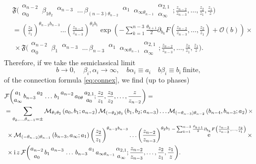 \documentclass[11pt]{article}
\numberwithin{equation}{section}
\newcommand{\ri}{{\rm i}}
\DeclareMathOperator{\re}{{\rm e}}
\newcommand{\Fn}[8]{\mathfrak{F}\bigg( \begin{matrix} #2 \\ #1 \end{matrix} \, #3 \, \begin{matrix} #4  \\ \, \end{matrix} \,#5 \, #6\,\begin{matrix} #7 \\  \, \end{matrix} \, #8 \, }
\newcommand{\Fns}[8]{\mathcal{F}\bigg( \begin{matrix} #2 \\ #1 \end{matrix} \, #3 \, \begin{matrix} #4  \\ \, \end{matrix} \,#5 \, #6\,\begin{matrix} #7 \\  \, \end{matrix} \, #8 \, }
\begin{document}
\begin{equation}\label{momentumshift}
\begin{aligned}
&\Fn{\alpha_{0}}{\alpha_{n-2}}{\beta_{1\theta_2}}{\alpha_{{n-3}}}{\dots}{\beta_{(n-3)\theta_{n-2}}}{\alpha_{{1}}}{\alpha_{\infty\theta_{n-1}}}\begin{matrix} \alpha_{2,1} \\ \alpha_{\infty}\end{matrix};\frac{z_{n-2}}{z_{n-3}},\dots,\frac{z_{2}}{z_1},\frac{z_{1}}{z}\bigg)\\
&=\left(\frac{z_{2}}{z_{1}}\right)^{\theta_{n-2}b_{n-3}}\dots\left(\frac{z_{n-2}}{z_{n-3}}\right)^{\theta_2b_{1}}\exp\left(-\sum_{k=1}^{n-3}\frac{\theta_{k+1}}{2}\partial_{b_k}F\left(\frac{z_{n-2}}{z_{n-3}},\dots,\frac{z_{2}}{z_1}\right)+\mathcal{O}(b)\right)\times\\
&\ \times\Fn{\alpha_{0}}{\alpha_{n-2}}{\beta_{1}}{\alpha_{{n-3}}}{\dots}{\beta_{n-3}}{\alpha_{{1}}}{\alpha_{\infty\theta_{n-1}}}\begin{matrix} \alpha_{2,1} \\ \alpha_{\infty}\end{matrix};\frac{z_{n-2}}{z_{n-3}},\dots,\frac{z_{2}}{z_1},\frac{z_{1}}{z}\bigg).
\end{aligned}
\end{equation}
%
Therefore, if we take  the semiclassical limit
\begin{equation}
b\to 0,\quad \beta_i, \alpha_i\to\infty,\quad b\alpha_i\equiv a_i\quad b\beta_i\equiv b_i\ \text{finite},
\end{equation}
of the connection formula \eqref{eq:connex}, we find (up to phases)
%
\begin{equation}\label{Mfactors}
\begin{aligned}
&\Fns{a_{\infty}}{a_{{1}}}{b_{n-3}}{a_{{2}}}{\dots}{b_1}{a_{n-2}}{a_{0\theta}}\begin{matrix} a_{2,1} \\ a_0\end{matrix};\frac{z_{2}}{z_{1}},\frac{z_{3}}{z_{2}},\dots,\frac{z}{z_{n-2}}\bigg)=\\
&=\sum_{\theta_2,\dots,\theta_{n-1}=\pm}\mathcal{M}_{\theta_1\theta_2}\left(a_0,b_1;a_{n-2}\right)\mathcal{M}_{(-\theta_2)\theta_3}\left(b_1,b_2;a_{n-3}\right)\dots\mathcal{M}_{(-\theta_{n-3})\theta_{n-2}}\left(b_{n-4},b_{n-3};a_{{2}}\right)\times\\
&\ \times\mathcal{M}_{(-\theta_{n-2})\theta_{n-1}}\left(b_{n-3},a_{\infty};a_{1}\right) \left(\frac{z_{2}}{z_{1}}\right)^{\theta_{n-2}b_{n-3}}\dots\left(\frac{z_{n-2}}{z_{n-3}}\right)^{\theta_2b_{1}}\re^{-\sum_{k=1}^{n-3}\frac{\theta_{k+1}}{2}\partial_{b_k}F\left(\frac{z_{n-2}}{z_{n-3}},\dots,\frac{z_{2}}{z_1}\right)}\times\\
&\ \times \ri\, z\,\Fns{a_{0}}{a_{n-2}}{b_{1}}{a_{{n-3}}}{\dots}{b_{n-3}}{a_{{1}}}{a_{\infty\theta_{n-1}}}\begin{matrix} \alpha_{2,1} \\ a_{\infty}\end{matrix};\frac{z_{n-2}}{z_{n-3}},\dots,\frac{z_{2}}{z_1},\frac{z_{1}}{z}\bigg).
\end{aligned}
\end{equation}
\end{document}
